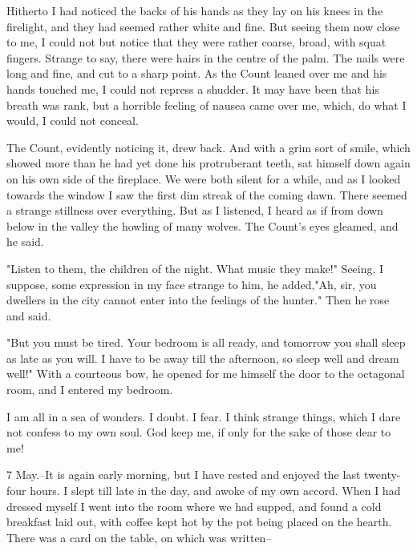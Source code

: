Hitherto I had noticed the backs of his hands as they lay on his knees in the firelight, and they had seemed rather white and fine. But seeing them now close to me, I could not but notice that they were rather coarse, broad, with squat fingers. Strange to say, there were hairs in the centre of the palm. The nails were long and fine, and cut to a sharp point. As the Count leaned over me and his hands touched me, I could not repress a shudder. It may have been that his breath was rank, but a horrible feeling of nausea came over me, which, do what I would, I could not conceal. 

The Count, evidently noticing it, drew back. And with a grim sort of smile, which showed more than he had yet done his protruberant teeth, sat himself down again on his own side of the fireplace. We were both silent for a while, and as I looked towards the window I saw the first dim streak of the coming dawn. There seemed a strange stillness over everything. But as I listened, I heard as if from down below in the valley the howling of many wolves. The Count's eyes gleamed, and he said. 

"Listen to them, the children of the night. What music they make!" Seeing, I suppose, some expression in my face strange to him, he added,"Ah, sir, you dwellers in the city cannot enter into the feelings of the hunter." Then he rose and said. 

"But you must be tired. Your bedroom is all ready, and tomorrow you shall sleep as late as you will. I have to be away till the afternoon, so sleep well and dream well!" With a courteous bow, he opened for me himself the door to the octagonal room, and I entered my bedroom. 

I am all in a sea of wonders. I doubt. I fear. I think strange things, which I dare not confess to my own soul. God keep me, if only for the sake of those dear to me! 

7 May.--It is again early morning, but I have rested and enjoyed the last twenty-four hours. I slept till late in the day, and awoke of my own accord. When I had dressed myself I went into the room where we had supped, and found a cold breakfast laid out, with coffee kept hot by the pot being placed on the hearth. There was a card on the table, on which was written-- 

